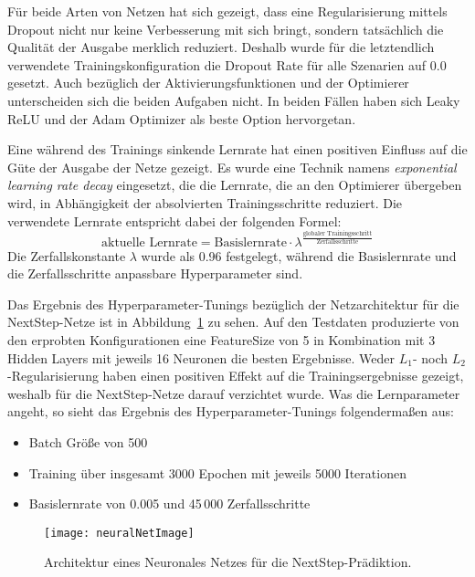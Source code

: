 Für beide Arten von Netzen hat sich gezeigt, dass eine Regularisierung mittels Dropout nicht nur keine Verbesserung mit sich bringt, sondern tatsächlich die Qualität der Ausgabe merklich reduziert.
Deshalb wurde für die letztendlich verwendete Trainingskonfiguration die Dropout Rate für alle Szenarien auf 0.0 gesetzt. 
Auch bezüglich der Aktivierungsfunktionen und der Optimierer unterscheiden sich die beiden Aufgaben nicht. 
In beiden Fällen haben sich Leaky ReLU und der Adam Optimizer als beste Option hervorgetan.

Eine während des Trainings sinkende Lernrate hat einen positiven Einfluss auf die Güte der Ausgabe der Netze gezeigt. 
Es wurde eine Technik namens \textit{exponential learning rate decay} eingesetzt,
die die Lernrate, die an den Optimierer übergeben wird, in Abhängigkeit der absolvierten Trainingsschritte reduziert.   
Die verwendete Lernrate entspricht dabei der folgenden Formel:
\begin{equation*}
	\text{aktuelle Lernrate} = \text{Basislernrate} \cdot \lambda ^{\frac{\text{globaler Trainingsschritt}}{\text{Zerfallsschritte}}}
\end{equation*}
Die Zerfallskonstante \(\lambda\) wurde als 0.96 festgelegt, während die Basislernrate und die Zerfallsschritte anpassbare Hyperparameter sind.


Das Ergebnis des Hyperparameter-Tunings bezüglich der Netzarchitektur für die NextStep-Netze ist in Abbildung~\ref{fig:netArchitectureNextStep} zu sehen.
Auf den Testdaten produzierte von den erprobten Konfigurationen eine FeatureSize von 5 in Kombination mit 3 Hidden Layers mit jeweils 16 Neuronen die besten Ergebnisse.
Weder \(L_1\)- noch \(L_2\)-Regularisierung haben einen positiven Effekt auf die Trainingsergebnisse gezeigt, weshalb für die NextStep-Netze darauf verzichtet wurde.
Was die Lernparameter angeht, so sieht das Ergebnis des Hyperparameter-Tunings folgendermaßen aus:
\begin{itemize}
    \item Batch Größe von 500
    \item Training über insgesamt 3000 Epochen mit jeweils 5000 Iterationen
    \item Basislernrate von 0.005 und 45\,000 Zerfallsschritte
\end{itemize}

\begin{figure}[h]
    \centering
	\texttt{[image: neuralNetImage]}
	\caption{Architektur eines Neuronales Netzes für die NextStep-Prädiktion.}
	\label{fig:netArchitectureNextStep}
\end{figure}

